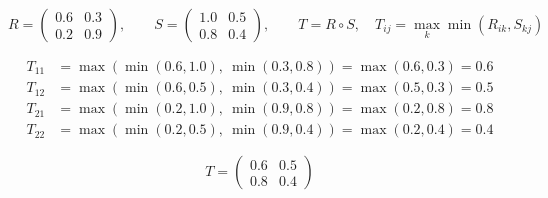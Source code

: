 \[
R = \begin{pmatrix} 0.6 & 0.3\\ 0.2 & 0.9 \end{pmatrix},\qquad
S = \begin{pmatrix} 1.0 & 0.5\\ 0.8 & 0.4 \end{pmatrix},\qquad
T = R \circ S,\quad T_{ij} = \max_k \min(R_{ik}, S_{kj})
\]
\begin{formulas}
\begin{align*}
T_{11} &= \max(\min(0.6, 1.0),\ \min(0.3, 0.8)) = \max(0.6, 0.3) = 0.6\\
T_{12} &= \max(\min(0.6, 0.5),\ \min(0.3, 0.4)) = \max(0.5, 0.3) = 0.5\\
T_{21} &= \max(\min(0.2, 1.0),\ \min(0.9, 0.8)) = \max(0.2, 0.8) = 0.8\\
T_{22} &= \max(\min(0.2, 0.5),\ \min(0.9, 0.4)) = \max(0.2, 0.4) = 0.4
\end{align*}
\end{formulas}
\[
T = \begin{pmatrix} 0.6 & 0.5\\ 0.8 & 0.4 \end{pmatrix}
\]